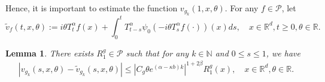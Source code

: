 \documentclass[12pt, a4paper]{amsart}
\newtheorem{lem}[thm]{Lemma}
\theoremstyle{definition}
\numberwithin{equation}{section}
\begin{document}
Hence, it is important to estimate the function $v_{g_k}(1,x,\theta)$. For any $f \in \mathcal{P}$, let
\begin{equation}\label{w2function}
    \tilde{v}_{f}(t,x,\theta)
    := i\theta T^{\alpha}_t f(x) + \int_0^t T^{\alpha}_{t-s}\psi_0(-i\theta T_s^{\alpha}f(\cdot))(x)ds,
    \quad x\in \mathbb R^d,t\geq 0, \theta \in \mathbb R.
\end{equation}

\begin{lem}\label{lemma2}
There exists $R^g_1 \in \mathcal{P}$ such that for any $k \in \mathbb{N}$ and $0\leq s \leq 1$, we have
\begin{align}
    |v_{g_k}(s,x,\theta)-\tilde{v}_{g_k}(s,x,\theta)|
    \leq |C_g\theta e^{(\alpha-\kappa b)k}|^{1+2\beta}R^g_1(x),
    \quad x\in \mathbb{R}^d,\theta\in \mathbb{R}.
\end{align}

\end{lem}
\end{document}
